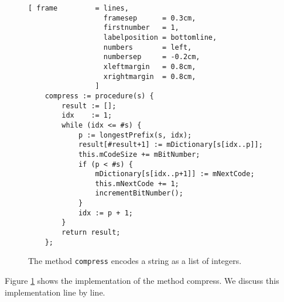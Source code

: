 \begin{figure}[!ht]
\centering
\begin{Verbatim}[ frame         = lines, 
                  framesep      = 0.3cm, 
                  firstnumber   = 1,
                  labelposition = bottomline,
                  numbers       = left,
                  numbersep     = -0.2cm,
                  xleftmargin   = 0.8cm,
                  xrightmargin  = 0.8cm,
                ]
    compress := procedure(s) {
        result := [];
        idx    := 1;
        while (idx <= #s) {
            p := longestPrefix(s, idx);
            result[#result+1] := mDictionary[s[idx..p]];
            this.mCodeSize += mBitNumber;
            if (p < #s) {
                mDictionary[s[idx..p+1]] := mNextCode;
                this.mNextCode += 1;
                incrementBitNumber();
            }
            idx := p + 1;
        }
        return result;
    };
\end{Verbatim}
\vspace*{-0.3cm}
\caption{The method \texttt{compress} encodes a string as a list of integers.}
\label{fig:lzw.stlx-compress}
\end{figure}
Figure \ref{fig:lzw.stlx-compress} shows the implementation of the method compress.  We discuss this
implementation line by line.
